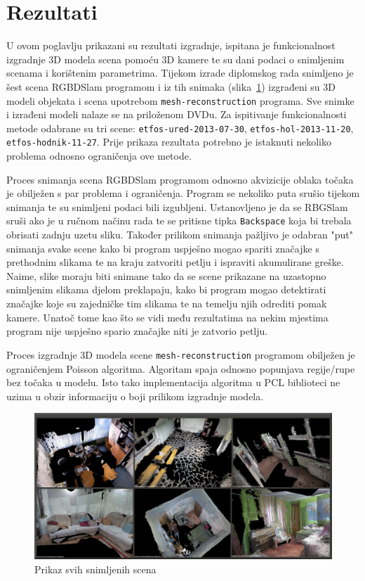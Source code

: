 \newpage
\setcounter{figure}{0}

\section{Rezultati} %
\label{sec:Rezultati}

U ovom poglavlju prikazani su rezultati izgradnje, ispitana je
funkcionalnost izgradnje 3D modela scena pomoću 3D kamere te su dani
podaci o snimljenim scenama i korištenim parametrima. Tijekom izrade
diplomskog rada snimljeno je šest scena RGBDSlam programom i iz tih
snimaka (slika~\ref{fig:01-all.png}) izgrađeni su 3D modeli objekata i
scena upotrebom \texttt{mesh-reconstruction} programa.  Sve snimke i
izrađeni modeli nalaze se na priloženom DVDu.  Za ispitivanje
funkcionalnosti metode odabrane su tri scene:
\texttt{etfos-ured-2013-07-30}, \texttt{etfos-hol-2013-11-20},
\texttt{etfos-hodnik-11-27}. Prije prikaza rezultata potrebno je
istaknuti nekoliko problema odnosno ograničenja ove metode.

Proces snimanja scena RGBDSlam programom odnosno akvizicije oblaka
točaka je obilježen s par problema i ograničenja. Program se nekoliko
puta srušio tijekom snimanja te su snimljeni podaci bili izgubljeni.
Ustanovljeno je da se RBGSlam sruši ako je u ručnom načinu rada te se
pritisne tipka \texttt{Backspace} koja bi trebala obrisati zadnju uzetu
sliku. Također prilikom snimanja pažljivo je odabran "put" snimanja
svake scene kako bi program uspješno mogao spariti značajke s prethodnim
slikama te na kraju zatvoriti petlju i ispraviti akumulirane greške.
Naime, slike moraju biti snimane tako da se scene prikazane na uzastopno
snimljenim slikama djelom preklapaju, kako bi program mogao detektirati
značajke koje su zajedničke tim slikama te na temelju njih odrediti
pomak kamere. Unatoč tome kao što se vidi među rezultatima na nekim
mjestima program nije uspješno spario značajke niti je zatvorio petlju.

Proces izgradnje 3D modela scene \texttt{mesh-reconstruction} programom
obilježen je ograničenjem Poisson algoritma. Algoritam spaja odnosno
popunjava regije/rupe bez točaka u modelu. Isto tako implementacija
algoritma u PCL biblioteci ne uzima u obzir informaciju o boji prilikom
izgradnje modela.

\begin{figure}[h]
\centering
\includegraphics[scale=0.19]{figures/01-all-pcd.png}
\caption{Prikaz svih snimljenih scena}
\label{fig:01-all.png}
\end{figure}

